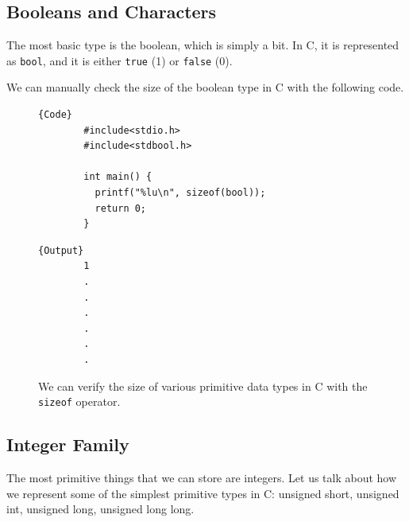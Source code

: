 \documentclass{article}
\begin{document}
  \subsection{Booleans and Characters} 

    \begin{definition}[Booleans in C]
      The most basic type is the boolean, which is simply a bit. In C, it is represented as \texttt{bool}, and it is either \texttt{true} (1) or \texttt{false} (0). 
    \end{definition}

    We can manually check the size of the boolean type in C with the following code. 

    \begin{figure}[H]
      \centering 
      \noindent\begin{minipage}{.5\textwidth}
      \begin{lstlisting}[firstnumber=1]{Code}
        #include<stdio.h>
        #include<stdbool.h>

        int main() {
          printf("%lu\n", sizeof(bool)); 
          return 0; 
        }
      \end{lstlisting}
      \end{minipage}
      \hfill
      \begin{minipage}{.49\textwidth}
      \begin{lstlisting}[]{Output}
        1
        .
        .
        .
        .
        .
        .
      \end{lstlisting}
      \end{minipage}
      \caption{We can verify the size of various primitive data types in C with the \texttt{sizeof} operator.} 
      \label{fig:boolean_size}
    \end{figure}

  \subsection{Integer Family}

    The most primitive things that we can store are integers. Let us talk about how we represent some of the simplest primitive types in C: unsigned short, unsigned int, unsigned long, unsigned long long.
\end{document}
